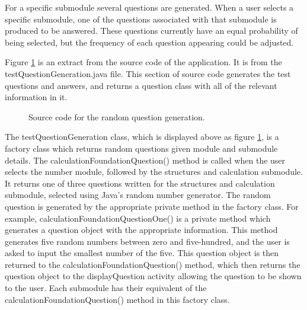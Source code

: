 \documentclass{article}
\begin{document}
For a specific submodule several questions are generated. When a user selects a specific submodule, one of the questions associated with that submodule is produced to be answered. These questions currently have an equal probability of being selected, but the frequency of each question appearing could be adjusted. \par

Figure \ref{figure:testQuestionGeneration} is an extract from the source code of the application. It is from the testQuestionGeneration.java file. This section of source code generates the test questions and answers, and returns a question class with all of the relevant information in it. 

\begin{figure}[H]
	\centering
	\caption{Source code for the random question generation.}
	\label{figure:testQuestionGeneration}
\end{figure}

The testQuestionGeneration class, which is displayed above as figure \ref{figure:testQuestionGeneration}, is a factory class which returns random questions given module and submodule details. The calculationFoundationQuestion() method is called when the user selects the number module, followed by the structures and calculation submodule. It returns one of three questions written for the structures and calculation submodule, selected using Java's random number generator. The random question is generated by the appropriate private method in the factory class. For example, calculationFoundationQuestionOne() is a private method which generates a question object with the appropriate information. This method generates five random numbers between zero and five-hundred, and the user is asked to input the smallest number of the five. This question object is then returned to the calculationFoundationQuestion() method, which then returns the question object to the displayQuestion activity allowing the question to be shown to the user. Each submodule has their equivalent of the calculationFoundationQuestion() method in this factory class. \par
\end{document}
